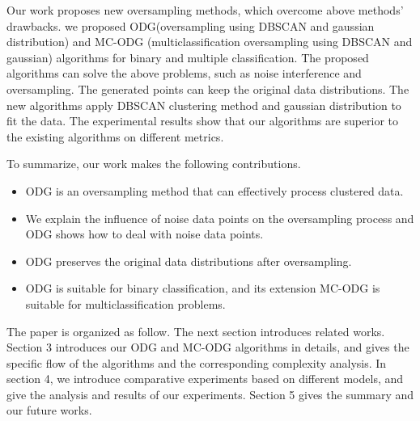 \documentclass[ida]{iosart2x}
\begin{document}

Our work proposes new oversampling methods, which overcome above methods' drawbacks.
we proposed ODG(oversampling using DBSCAN and gaussian distribution) and MC-ODG
(multiclassification oversampling using DBSCAN and gaussian) algorithms 
for binary and multiple classification.
The proposed algorithms can solve the above problems, such as noise interference and oversampling. 
The generated points can keep the original data distributions.
The new algorithms apply DBSCAN clustering method and gaussian
distribution to fit the data.
The experimental results show that our algorithms are superior 
to the existing algorithms on different metrics.

To summarize, our work makes the following contributions.
\begin{itemize}
  \item ODG is an oversampling method that can effectively process clustered data.
  \item We explain the influence of noise data points on the oversampling process and ODG shows how to deal with noise data points.
  \item ODG preserves the original data distributions after oversampling.
  \item ODG is suitable for binary classification, and its extension MC-ODG is suitable for multiclassification problems.
\end{itemize}

The paper is organized as follow. The next section introduces 
related works. Section 3 introduces our ODG and MC-ODG 
algorithms in details, 
and gives the specific flow of the algorithms and the corresponding complexity analysis.
In section 4, we introduce comparative experiments based on different models, 
and give the analysis and results of our experiments. Section 5 gives the summary and our future works.
\end{document}
